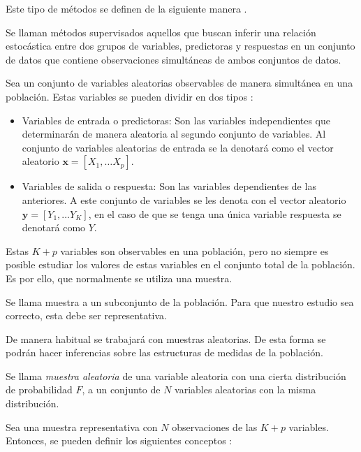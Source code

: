 \noindent Este tipo de métodos se definen de la siguiente manera \cite{Mahesh 2020}. 
\begin{defi}
Se llaman métodos supervisados  aquellos  que buscan inferir una relación estocástica entre dos grupos de variables, predictoras y respuestas en un conjunto de datos que contiene observaciones simultáneas de ambos conjuntos de datos. 
\end{defi}
\noindent Sea un conjunto de variables aleatorias observables de manera simultánea en una población. Estas variables se pueden dividir en dos tipos \cite{Hastie 2001}:
\begin{itemize}
\item Variables de entrada o predictoras: Son las variables independientes que determinarán de manera aleatoria al segundo conjunto de variables. Al conjunto de variables aleatorias de entrada se la denotará como el vector aleatorio $\textbf{x}=[X_1,\ldots X_p]$.

\item Variables de salida o respuesta: Son las variables dependientes de las anteriores. A este conjunto de variables se les denota con el vector aleatorio $\textbf{y}=[Y_1,\ldots Y_K]$, en el caso de que se tenga una única variable respuesta se denotará como $Y$. 
\end{itemize}

\noindent Estas $K+p$ variables son observables en una población, pero no siempre es posible estudiar los valores de estas variables en el conjunto total de la población. Es por ello, que normalmente se utiliza una muestra. 

\begin{defi}
Se llama muestra a un subconjunto de la población. Para que nuestro estudio sea correcto, esta debe ser representativa.
\end{defi}

\noindent De manera habitual se trabajará con muestras aleatorias.  De esta forma se podrán hacer inferencias sobre las estructuras de medidas de la población. 

\begin{defi}
Se llama \emph{muestra aleatoria} de una variable aleatoria con una cierta distribución de probabilidad $F$, a un conjunto de $N$ variables aleatorias con la misma distribución. 
\end{defi} 

\noindent Sea una muestra representativa con $N$ observaciones de las $K+p$ variables. Entonces, se pueden definir los siguientes conceptos \cite{Chatfield 1989}:

